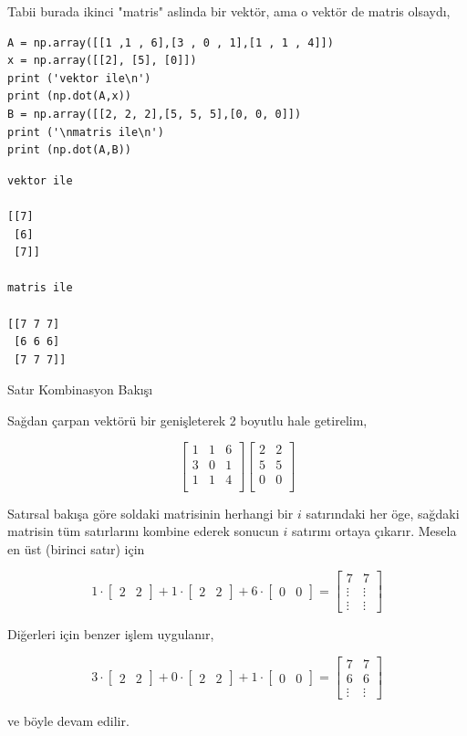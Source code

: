 \documentclass[12pt,fleqn]{article}\usepackage{../../common}
\begin{document}
Tabii burada ikinci "matris" aslinda bir vektör, ama o vektör de matris
olsaydı,

\begin{verbatim}
A = np.array([[1 ,1 , 6],[3 , 0 , 1],[1 , 1 , 4]])
x = np.array([[2], [5], [0]])
print ('vektor ile\n')
print (np.dot(A,x))
B = np.array([[2, 2, 2],[5, 5, 5],[0, 0, 0]])
print ('\nmatris ile\n')
print (np.dot(A,B))
\end{verbatim}

\begin{verbatim}
vektor ile

[[7]
 [6]
 [7]]

matris ile

[[7 7 7]
 [6 6 6]
 [7 7 7]]
\end{verbatim}

Satır Kombinasyon Bakışı

Sağdan çarpan vektörü bir genişleterek 2 boyutlu hale getirelim, 

$$
\left[\begin{array}{ccc}
1 & 1 & 6 \\
3 & 0 & 1 \\
1 & 1 & 4 \\
\end{array}\right]
\left[\begin{array}{ccc}
2 & 2  \\
5 & 5  \\
0 & 0  \\
\end{array}\right]
$$

Satırsal bakışa göre soldaki matrisinin herhangi bir $i$ satırındaki her
öge, sağdaki matrisin tüm satırlarını kombine ederek sonucun $i$ satırını
ortaya çıkarır. Mesela en üst (birinci satır) için

$$ 
1 \cdot
\left[\begin{array}{cc}
2 & 2
\end{array}\right] +
1 \cdot
\left[\begin{array}{cc}
2 & 2
\end{array}\right] + 
6 \cdot
\left[\begin{array}{cc}
0 & 0
\end{array}\right] 
=
\left[\begin{array}{cc}
7 & 7 \\
\vdots & \vdots \\
\vdots & \vdots
\end{array}\right] 
$$

Diğerleri için benzer işlem uygulanır, 

$$ 
3 \cdot
\left[\begin{array}{cc}
2 & 2
\end{array}\right] +
0 \cdot
\left[\begin{array}{cc}
2 & 2
\end{array}\right] + 
1 \cdot
\left[\begin{array}{cc}
0 & 0
\end{array}\right] 
=
\left[\begin{array}{cc}
7 & 7 \\
6 & 6 \\
\vdots & \vdots
\end{array}\right] 
$$

ve böyle devam edilir.
\end{document}
